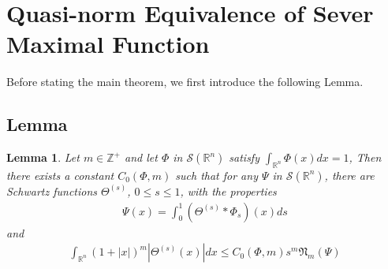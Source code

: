 \documentclass[12pt]{article}  %
\numberwithin{equation}{subsection}
\newtheorem{lemma}[thm]{Lemma}
\theoremstyle{plain}
\begin{document}
\section{Quasi-norm Equivalence of Sever Maximal Function}
Before stating the main theorem, we first introduce the following Lemma.
\subsection{Lemma}
\begin{lemma}
	Let $m \in \mathbb{Z}^+$ and let $\varPhi$ in $\mathcal{S}(\mathbb{R}^n)$ satisfy $\int_{\mathbb{R}^n}\varPhi(x)dx = 1$, Then there exists a constant $C_0(\varPhi, m)$ such that for any $\varPsi$ in $\mathcal{S}(\mathbb{R}^n)$, there are Schwartz functions $\varTheta^{(s)}$, $0\le s\le 1$, with the properties
	\begin{align}
		\varPsi(x) = \int_{0}^{1}(\varTheta^{(s)}*\varPhi_s)(x)ds \label{lemma}
	\end{align}
	and
	\begin{align}
		\int_{\mathbb{R}^n}(1+|x|)^m\left| \varTheta^{(s)}(x) \right| dx \le C_0(\varPhi, m)s^m\mathfrak{N}_m(\varPsi)
	\end{align}
\end{lemma}
\end{document}

